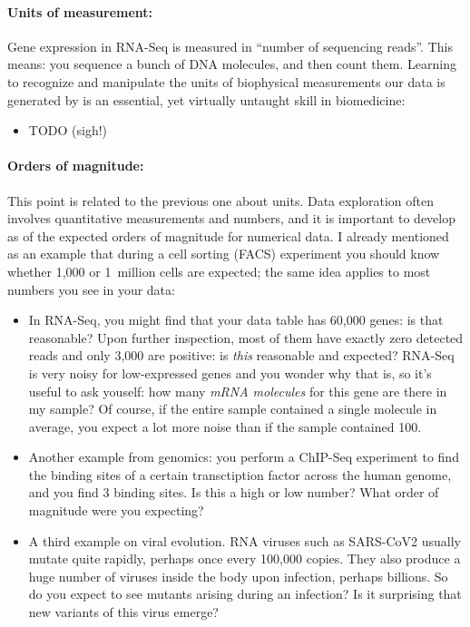 \documentclass[12pt,a4paper,notitlepage,onecolumn]{article}
\begin{document}
\paragraph{Units of measurement:} Gene expression in RNA-Seq is measured in ``number of sequencing reads''. This means: you sequence a bunch of DNA molecules, and then count them. Learning to recognize and manipulate the units of biophysical measurements our data is generated by is an essential, yet virtually untaught skill in biomedicine:

\begin{itemize}
\item  TODO (sigh!)
\end{itemize}

\paragraph{Orders of magnitude:} This point is related to the previous one about units. Data exploration often involves quantitative measurements and numbers, and it is important to develop as of the expected orders of magnitude for numerical data. I already mentioned as an example that during a cell sorting (FACS) experiment you should know whether 1,000 or 1~million cells are expected; the same idea applies to most numbers you see in your data:

\begin{itemize}
\item In RNA-Seq, you might find that your data table has 60,000 genes: is that reasonable? Upon further inspection, most of them have exactly zero detected reads and only 3,000 are positive: is \textit{this} reasonable and expected? RNA-Seq is very noisy for low-expressed genes and you wonder why that is, so it's useful to ask youself: how many \textit{mRNA molecules} for this gene are there in my sample? Of course, if the entire sample contained a single molecule in average, you expect a lot more noise than if the sample contained 100.
\item Another example from genomics: you perform a ChIP-Seq experiment to find the binding sites of a certain transctiption factor across the human genome, and you find 3 binding sites. Is this a high or low number? What order of magnitude were you expecting?
\item A third example on viral evolution. RNA viruses such as SARS-CoV2 usually mutate quite rapidly, perhaps once every 100,000 copies. They also produce a huge number of viruses inside the body upon infection, perhaps billions. So do you expect to see mutants arising during an infection? Is it surprising that new variants of this virus emerge?
\end{itemize}
\end{document}
